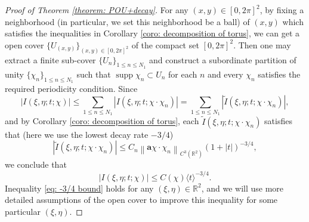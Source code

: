 \documentclass[10pt,a4paper]{amsart}
\newcommand\JP[1]{\langle#1\rangle}
\newcommand\norm[1]{\left\|#1\right\|}
\newcommand{\R}{\mathbb{R}}
\begin{document}
\begin{proof}[Proof of Theorem \ref{theorem: POU+decay}]
    For any $\left(x,y\right)\in\left[0,2\pi\right]^{2}$, by fixing a neighborhood (in particular, we set this neighborhood be a ball) of $\left(x,y\right)$ which satisfies the inequalities in Corollary \ref{coro: decomposition of torus}, we can get a open cover $\{U_{\left(x,y\right)}\}_{\left(x,y\right)\in\left[0,2\pi\right]^{2}}$ of the compact set $\left[0,2\pi\right]^{2}$. Then one may extract a finite sub-cover $\{U_n\}_{1\le n\le N_1}$ and construct a subordinate partition of unity $\{\chi_n\}_{1\le n\le N_1}$ such that $\operatorname{supp}\chi_n\subset U_n$ for each $n$ and every $\chi_n$ satisfies the required periodicity condition. Since
    \begin{equation}
        \left|I\left(\xi,\eta;t;\chi\right)\right|\leq\sum_{1\leq n\leq N_{1}}\left|I\left(\xi,\eta;t;\chi\cdot\chi_{n}\right)\right|=\sum_{1\leq n\leq N_{1}}\left|\widetilde{I}\left(\xi,\eta;t;\chi\cdot\chi_{n}\right)\right|,
    \end{equation}
    and by Corollary \ref{coro: decomposition of torus}, each $\widetilde{I}\left(\xi,\eta;t;\chi\cdot\chi_{n}\right)$ satisfies that (here we use the lowest decay rate $-3/4$)
    \begin{equation*}
        \left|\widetilde{I}\left(\xi,\eta;t;\chi\cdot\chi_{n}\right)\right|\leq C_{n}\norm{\mathbf{a}\chi\cdot\chi_{n}}_{C^{3}\left(\R^{2}\right)}\left(1+\left|t\right|\right)^{-3/4},
    \end{equation*}
    we conclude that
    \begin{equation}\label{eq: -3/4 bound}
        \left|I\left(\xi,\eta;t;\chi\right)\right|\leq C\left(\chi\right)\JP{t}^{-3/4}.
    \end{equation}
    Inequality \eqref{eq: -3/4 bound} holds for any $\left(\xi,\eta\right)\in\R^{2}$, and we will use more detailed assumptions of the open cover to improve this inequality for some particular $\left(\xi,\eta\right)$. 
    

\end{proof}
\end{document}
